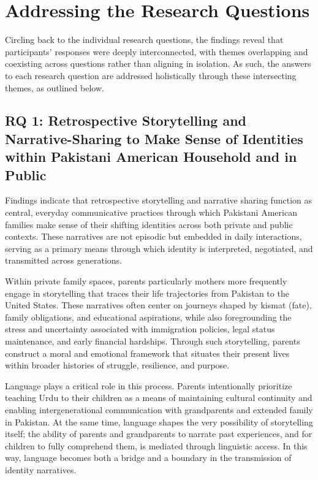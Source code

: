 \section{Addressing the Research Questions}

Circling back to the individual research questions, the findings reveal that participants’ responses were deeply interconnected, with themes overlapping and coexisting across questions rather than aligning in isolation. As such, the answers to each research question are addressed holistically through these intersecting themes, as outlined below.

\subsection{RQ 1: Retrospective Storytelling and Narrative-Sharing to Make Sense of Identities within Pakistani American Household and in Public}

Findings indicate that retrospective storytelling and narrative sharing function as central, everyday communicative practices through which Pakistani American families make sense of their shifting identities across both private and public contexts. These narratives are not episodic but embedded in daily interactions, serving as a primary means through which identity is interpreted, negotiated, and transmitted across generations.

Within private family spaces, parents particularly mothers more frequently engage in storytelling that traces their life trajectories from Pakistan to the United States. These narratives often center on journeys shaped by kismat (fate), family obligations, and educational aspirations, while also foregrounding the stress and uncertainty associated with immigration policies, legal status maintenance, and early financial hardships. Through such storytelling, parents construct a moral and emotional framework that situates their present lives within broader histories of struggle, resilience, and purpose.

Language plays a critical role in this process. Parents intentionally prioritize teaching Urdu to their children as a means of maintaining cultural continuity and enabling intergenerational communication with grandparents and extended family in Pakistan. At the same time, language shapes the very possibility of storytelling itself; the ability of parents and grandparents to narrate past experiences, and for children to fully comprehend them, is mediated through linguistic access. In this way, language becomes both a bridge and a boundary in the transmission of identity narratives.

